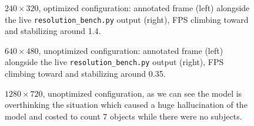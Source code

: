\begin{table}[H]
\centering
\caption{Resolution sweep results, averaged over a 5-minute run (60 samples, 5s interval) per configuration.}
\label{tab:resolution-sweep}
\end{table}

\begin{figure}[H]
\centering
\caption{$240\times320$, optimized configuration: annotated frame (left) alongside the live \texttt{resolution\_bench.py} output (right), FPS climbing toward and stabilizing around 1.4.}\label{fig:320p-result}
\end{figure}

\begin{figure}[H]
\centering
\caption{$640\times480$, unoptimized configuration: annotated frame (left) alongside the live \texttt{resolution\_bench.py} output (right), FPS climbing toward and stabilizing around 0.35.}\label{fig:480p-result}
\end{figure}

\begin{figure}[H]
\centering
\caption{$1280\times720$, unoptimized configuration, as we can see the model is overthinking the situation which caused a huge hallucination of the model and costed to count 7 objects while there were no subjects.}\label{fig:720p-unoptimized}
\end{figure}

